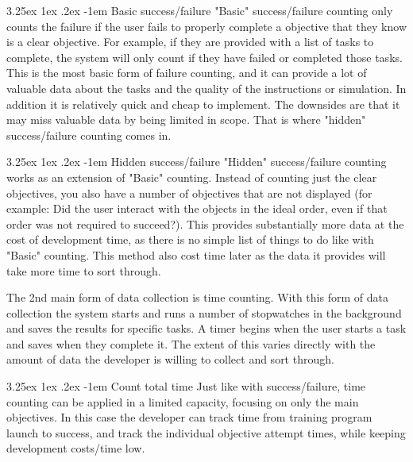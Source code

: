 \documentclass[onecolumn, draftclsnofoot,10pt, compsoc]{IEEEtran}
\makeatletter
\newcounter{subsubsubsection}[subsubsection]
\renewcommand\paragraph{\@startsection{paragraph}{5}{\z@}%
  {3.25ex \@plus1ex \@minus.2ex}%
  {-1em}%
  {\normalfont\normalsize\bfseries}}
\makeatother
\begin{document}
\paragraph{Basic success/failure}
"Basic" success/failure counting only counts the failure if the user fails to properly complete a objective that they know is a clear objective. For example, if they are provided with a list of tasks to complete, the system will only count if they have failed or completed those tasks. This is the most basic form of failure counting, and it can provide a lot of valuable data about the tasks and the quality of the instructions or simulation. In addition it is relatively quick and cheap to implement. The downsides are that it may miss valuable data by being limited in scope. That is where "hidden" success/failure counting comes in.

\paragraph{Hidden success/failure}
 "Hidden" success/failure counting works as an extension of "Basic" counting.  Instead of counting just the clear objectives, you also have a number of objectives that are not displayed (for example: Did the user interact with the objects in the ideal order, even if that order was not required to succeed?). This provides substantially more data at the cost of development time, as there is no simple list of things to do like with "Basic" counting. This method also cost time later as the data it provides will take more time to sort through. 

The 2nd main form of data collection is time counting. With this form of data collection the system starts and runs a number of stopwatches in the background and saves the results for specific tasks. A timer begins when the user starts a task and saves when they complete it. The extent of this varies directly with the amount of data the developer is willing to collect and sort through. 


\paragraph{Count total time}
Just like with success/failure, time counting can be applied in a limited capacity, focusing on only the main objectives. In this case the developer can track time from training program launch to success, and track the individual objective attempt times, while keeping development costs/time low. 
\end{document}

